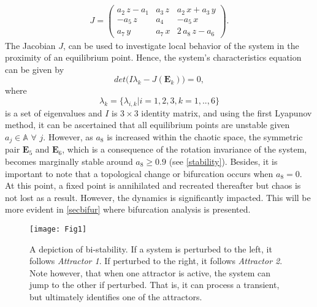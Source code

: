 \documentclass[final,5p,times,twocolumn]{elsarticle}
\begin{document}
\begin{equation}
\begin{split}
J = \left(\begin{array}{ccc} a_{2}\,z-a_{1} & a_{3}\,z & a_{2}\,x+a_{3}\,y\\ -a_{5}\,z & a_{4} & -a_{5}\,x\\ a_{7}\,y & a_{7}\,x & 2\,a_{8}\,z-a_{6} \end{array}\right).
\end{split}
\end{equation}
The Jacobian $J$, can be used to investigate local behavior of the system in the proximity of an equilibrium point. Hence, the system's characteristics equation can be given by
\begin{equation}
det\bigg(I\lambda_k-J(\bm{E}_k)\bigg)=0\label{characteristicseqn},
\end{equation} 
where
\begin{equation}
\lambda_k = \{\lambda_{i,k}\vert i = 1,2,3, k=1,..,6\}\label{eigval}
\end{equation}
is a set of eigenvalues and $I$ is $3\times3$ identity matrix, and using the first Lyapunov method, it can be ascertained that all equilibrium points are unstable given $a_j\in\mathbb{A}$ $\forall$ $j$. However, as $a_8$ is increased within the chaotic space, the symmetric pair $\bm{E}_5$ and $\bm{E}_6$, which is a consequence of the rotation invariance of the system, becomes marginally stable around $a_8\ge0.9$ (see \cref{stability}). Besides, it is important to note that a topological change or bifurcation occurs when $a_8=0$. At this point, a fixed point is annihilated and recreated thereafter but chaos is not lost as a result. However, the dynamics is significantly impacted. This will be more evident in \cref{secbifur} where bifurcation analysis is presented. 
\begin{figure}[htbp]
	\texttt{[image: Fig1]}
	\caption{A depiction of bi-stability. If a system is perturbed to the left, it follows \textit{Attractor 1}. If perturbed to the right, it follows \textit{Attractor 2}. Note however, that when one attractor is active, the system can jump to the other if perturbed. That is, it can process a transient, but ultimately identifies one of the attractors.}
	\label{bistability}
\end{figure} 
\end{document}
